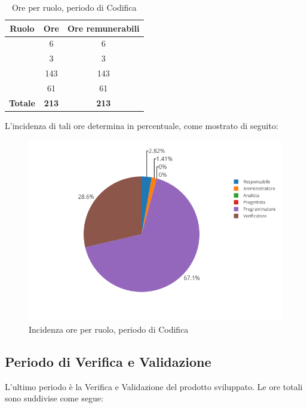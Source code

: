 \begin{table}[H]
	\begin{center}
		\begin{tabular}{|c|c|c|}
			\hline
			\textbf{Ruolo}	& \textbf{Ore}	& \textbf{Ore remunerabili} \\
			\hline
			\Res	&	6	&	6	\\
			\hline
			\Amm	&	3	&	3	\\
			\hline
			\Progr   &	143   &	143	\\
			\hline
			\Ver	&	61	&	61	\\
			\hline
			\textbf{Totale} & \textbf{213} & \textbf{213} \\
			\hline
		\end{tabular}
	\end{center}
	\caption{Ore per ruolo, periodo di Codifica}
\end{table}

L'incidenza di tali ore determina in percentuale, come mostrato di seguito:
\begin{figure}[H]
	\centering
	\includegraphics[scale=0.6]{img/Codifica.png}
	\caption{Incidenza ore per ruolo, periodo di Codifica}
\end{figure}

\subsection{Periodo di Verifica e Validazione}
L'ultimo periodo è la Verifica e Validazione del prodotto sviluppato. Le ore totali sono suddivise come segue:

